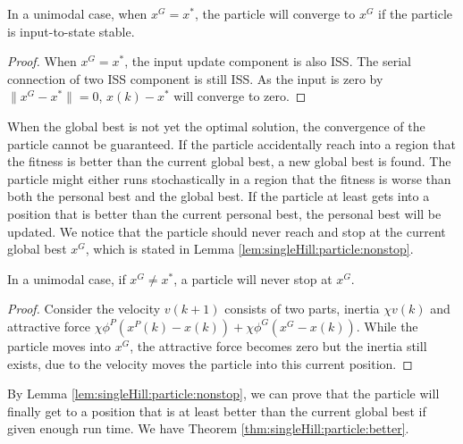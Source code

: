 \begin{mylem}
\label{lem:singleHill:particle:converge}
In a unimodal case, when $ x^{G} = x^{*} $, the particle will converge to $ x^{G} $ if the particle is input-to-state stable.
\begin{proof}
When $ x^{G} = x^{*} $, the input update component is also ISS.
The serial connection of two ISS component is still ISS.
As the input is zero by $ \lVert x^{G} - x^{*} \rVert = 0 $, $ x(k) - x^{*} $ will converge to zero.
\end{proof}
\end{mylem}

When the global best is not yet the optimal solution, the convergence of the particle cannot be guaranteed.
If the particle accidentally reach into a region that the fitness is better than the current global best, a new global best is found.
The particle might either runs stochastically in a region that the fitness is worse than both the personal best and the global best.
If the particle at least gets into a position that is better than the current personal best, the personal best will be updated. 
We notice that the particle should never reach and stop at the current global best $ x^{G} $, which is stated in Lemma \ref{lem:singleHill:particle:nonstop}.

\begin{mylem}
\label{lem:singleHill:particle:nonstop}
In a unimodal case, if $ x^{G} \not = x^{*} $, a particle will never stop at $ x^{G} $. 
\begin{proof}
Consider the velocity $ v(k+1) $ consists of two parts, inertia $ \chi v(k) $ and attractive force $ \chi \phi^{P} (x^{P}(k) - x(k) ) + \chi \phi^{G} ( x^{G} - x(k) ) $.
While the particle moves into $ x^{G} $, the attractive force becomes zero but the inertia still exists, due to the velocity moves the particle into this current position.
\end{proof} 
\end{mylem}

By Lemma \ref{lem:singleHill:particle:nonstop}, we can prove that the particle will finally get to a position that is at least better than the current global best if given enough run time.
We have Theorem \ref{thm:singleHill:particle:better}.

